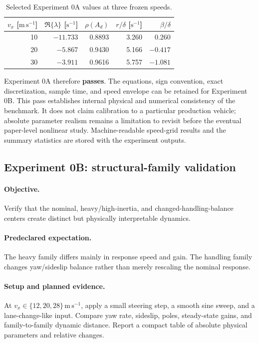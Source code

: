 \begin{table}[ht]
\centering
\caption{Selected Experiment 0A values at three frozen speeds.}
\label{tab:experiment0a}
\begin{tabular}{rrrrr}
\toprule
$v_x$ [$\mathrm{m\,s^{-1}}$] & $\Re\{\lambda\}$ [$\mathrm{s^{-1}}$]
& $\rho(A_d)$ & $r/\delta$ [$\mathrm{s^{-1}}$] & $\beta/\delta$\\
\midrule
10 & $-11.733$ & 0.8893 & 3.260 & 0.260\\
20 & $-5.867$ & 0.9430 & 5.166 & $-0.417$\\
30 & $-3.911$ & 0.9616 & 5.757 & $-1.081$\\
\bottomrule
\end{tabular}
\end{table}

Experiment 0A therefore \textbf{passes}. The equations, sign convention, exact
discretization, sample time, and speed envelope can be retained for Experiment
0B. This pass establishes internal physical and numerical consistency of the
benchmark. It does not claim calibration to a particular production vehicle;
absolute parameter realism remains a limitation to revisit before the eventual
paper-level nonlinear study. Machine-readable speed-grid results and the summary
statistics are stored with the experiment outputs.

\subsection{Experiment 0B: structural-family validation}
\paragraph{Objective.}
Verify that the nominal, heavy/high-inertia, and changed-handling-balance centers
create distinct but physically interpretable dynamics.

\paragraph{Predeclared expectation.}
The heavy family differs mainly in response speed and gain. The handling family
changes yaw/sideslip balance rather than merely rescaling the nominal response.

\paragraph{Setup and planned evidence.}
At $v_x\in\{12,20,28\}\,\mathrm{m\,s^{-1}}$, apply a small steering step, a smooth
sine sweep, and a lane-change-like input. Compare yaw rate, sideslip, poles,
steady-state gains, and family-to-family dynamic distance. Report a compact table
of absolute physical parameters and relative changes.

